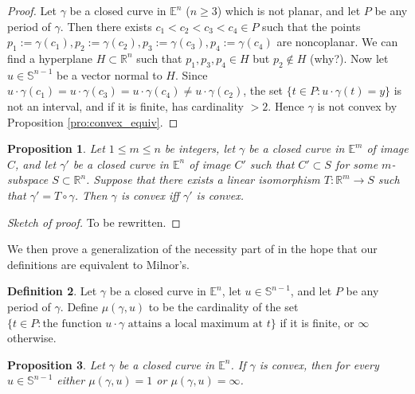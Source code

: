 \documentclass{amsart}
\newtheorem{proposition}{Proposition}[section]
\theoremstyle{definition}
\newtheorem{definition}[proposition]{Definition}
\theoremstyle{remark}
\begin{document}
\begin{proof}
    Let $\gamma$ be a closed curve in $\mathbb{E}^n$ ($n\ge 3$) which
    is not planar, and let $P$ be any period of $\gamma$.
    Then there exists $c_1<c_2<c_3<c_4\in P$ such that the points
    $p_1:=\gamma(c_1),p_2:=\gamma(c_2),
        p_3:=\gamma(c_3),p_4:=\gamma(c_4)$
    are noncoplanar. We can find a hyperplane $H\subset\mathbb{R}^n$
    such that $p_1,p_3,p_4\in H$ but $p_2\notin H$ (why?). Now let
    $u\in\mathbb{S}^{n-1}$ be a vector normal to $H$. Since
    $u\cdot\gamma(c_1)=u\cdot\gamma(c_3)=u\cdot\gamma(c_4)
        \ne u\cdot\gamma(c_2)$,
    the set $\{t\in P:u\cdot\gamma(t)=y\}$ is not an interval,
    and if it is finite, has cardinality $>2$. Hence $\gamma$
    is not convex by Proposition \ref{pro:convex_equiv}.
\end{proof}

\begin{proposition}
    \label{pro:convex_preserved}
    Let $1\le m\le n$ be integers, let $\gamma$ be a closed curve
    in $\mathbb{E}^m$ of image $C$, and let $\gamma'$ be a closed curve
    in $\mathbb{E}^n$ of image $C'$ such that $C'\subset S$
    for some $m$-subspace $S\subset\mathbb{R}^n$.
    Suppose that there exists a linear isomorphism
    $T:\mathbb{R}^m\to S$ such that $\gamma'=T\circ\gamma$.
    Then $\gamma$ is convex iff $\gamma'$ is convex.
\end{proposition}

\begin{proof}[Sketch of proof]
    To be rewritten.
\end{proof}

We then prove a generalization of the necessity part
of \cite[Lemma 3.3]{milnor} in the hope that
our definitions are equivalent to Milnor's.

\begin{definition}
    Let $\gamma$ be a closed curve in $\mathbb{E}^n$,
    let $u\in\mathbb{S}^{n-1}$,
    and let $P$ be any period of $\gamma$.
    Define $\mu(\gamma,u)$ to be the cardinality of the set
    $\{t\in P:\text{the function }u\cdot\gamma
        \text{ attains a local maximum at }t\}$
    if it is finite, or $\infty$ otherwise.
\end{definition}

\begin{proposition}
    Let $\gamma$ be a closed curve in $\mathbb{E}^n$.
    If $\gamma$ is convex, then for every $u\in\mathbb{S}^{n-1}$
    either $\mu(\gamma,u)=1$ or $\mu(\gamma,u)=\infty$.
\end{proposition}
\end{document}
